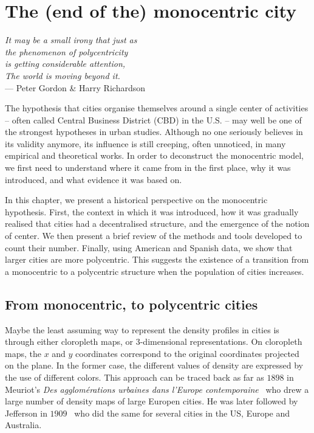 %
\chapter{The (end of the) monocentric city}
\label{chap:monocentric_introduction}

\begin{flushright}{\slshape    
It may be a small irony that  
just as\\
the phenomenon of polycentricity\\ is getting considerable attention,\\
The world is moving beyond it.} \\ \medskip
--- Peter Gordon \& Harry Richardson~\cite{Gordon:1996}
\end{flushright}


\bigskip


The hypothesis that cities organise themselves around a single center of
activities -- often called Central Business District (CBD) in the U.S. -- may well
be one of the strongest hypotheses in urban studies. Although no one seriously
believes in its validity anymore, its influence is still creeping, often
unnoticed, in many empirical and theoretical works.  In order to deconstruct the
monocentric model, we first need to understand where it came from in the first
place, why it was introduced, and what evidence it was based on. 

In this chapter, we present a historical perspective on the monocentric
hypothesis. First, the context in which it was introduced, how it was gradually
realised that cities had a decentralised structure, and the emergence of the
notion of center. We then present a brief review of the methods and tools
developed to count their number. Finally, using American and Spanish data, we
show that larger cities are more polycentric. This suggests the existence of a
transition from a monocentric to a polycentric structure when the population of
cities increases.

\section{From monocentric, to polycentric cities}
\label{sec:introduction}

Maybe the least assuming way to represent the density profiles in cities is
through either cloropleth maps, or 3-dimensional representations. On cloropleth
maps, the $x$ and $y$ coordinates correspond to the original coordinates
projected on the plane. In the former case, the different values of density are
expressed by the use of different colors. This approach can be traced back as
far as $1898$ in Meuriot's \emph{Des agglom\'erations urbaines dans l'Europe
contemporaine}~\cite{Meuriot:1898} who drew a large number of density maps of
large Europen cities. He was later followed by Jefferson in
$1909$~\cite{Jefferson:1909} who did the same for several cities in the US,
Europe and Australia.\\



